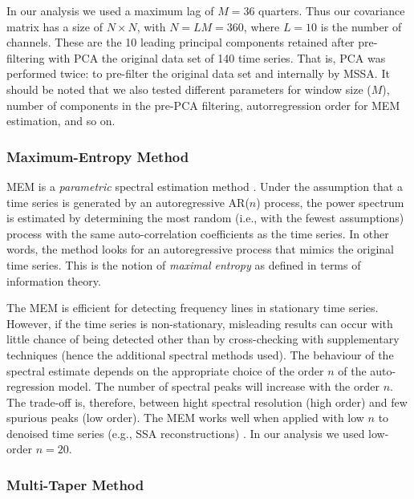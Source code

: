 In our analysis we used a maximum lag of $M = 36$ quarters. Thus our covariance matrix has a size of $N \times N$, with $N = LM = 360$, where $L = 10$ is the number of channels. These are the 10 leading principal components retained after pre-filtering with PCA the original data set of 140 time series. That is, PCA was performed twice: to pre-filter the original data set and internally by MSSA. It should be noted that we also tested different parameters for window size ($M$), number of components in the pre-PCA filtering, autorregression order for MEM estimation, and so on.

\subsubsection*{Maximum-Entropy Method}

\noindent
MEM is a \emph{parametric} spectral estimation method \parencite{Childers1978}. Under the assumption that a time series is generated by an autoregressive AR($n$) process, the power spectrum is estimated by determining the most random (i.e., with the fewest assumptions) process with the same auto-correlation coefficients as the time series. In other words, the method looks for an autoregressive process that mimics the original time series. This is the notion of \emph{maximal entropy} as defined in terms of information theory.

The MEM is efficient for detecting frequency lines in stationary time series. However, if the time series is non-stationary, misleading results can occur with little chance of being detected other than by cross-checking with supplementary techniques (hence the additional spectral methods used). The behaviour of the spectral estimate depends on the appropriate choice of the order $n$ of the auto-regression model. The number of spectral peaks will increase with the order $n$. The trade-off is, therefore, between hight spectral resolution (high order) and few spurious peaks (low order). The MEM works well when applied with low $n$ to denoised time series (e.g., SSA reconstructions) \parencite{Penland1991}. In our analysis we used low-order $n=20$.

\subsubsection*{Multi-Taper Method}

